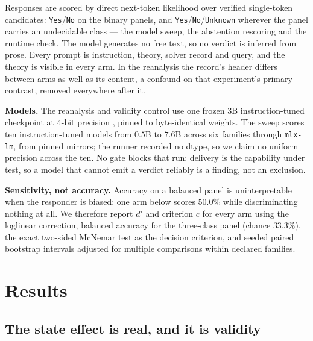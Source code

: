 \documentclass{article}
\begin{document}
Responses are scored by direct next-token likelihood over verified single-token
candidates: \texttt{Yes}/\texttt{No} on the binary panels, and
\texttt{Yes}/\texttt{No}/\texttt{Unknown} wherever the panel carries an
undecidable class --- the model sweep, the abstention rescoring and the runtime
check. The model generates no
free text, so no verdict is inferred from prose. Every prompt is instruction,
theory, solver record and query, and the theory is visible in every arm. In the
reanalysis the record's header differs between arms as well as its content, a
confound on that experiment's primary contrast, removed everywhere after it.

\textbf{Models.} The reanalysis and validity control use one frozen 3B
instruction-tuned checkpoint at 4-bit precision \citep{team2024qwen}, pinned to
byte-identical weights. The sweep scores ten instruction-tuned models from
$0.5$B to $7.6$B across six families
\citep{team2024qwen,grattafiori2024llama,team2025gemma,microsoft2025phi,team2024olmo,allal2025smollm}
through \texttt{mlx-lm}, from pinned mirrors; the runner recorded no dtype,
so we claim no uniform precision across the ten. No gate blocks that run:
delivery is the capability under test, so a model that cannot emit a verdict
reliably is a finding, not an exclusion.

\textbf{Sensitivity, not accuracy.} Accuracy on a balanced panel is
uninterpretable when the responder is biased: one arm below scores $50.0\%$
while discriminating nothing at all. We therefore report $d'$ and criterion $c$
for every arm
\citep{macmillan1991detection,stanislaw1999calculation} using the loglinear
correction, balanced accuracy for the three-class panel (chance $33.3\%$), the
exact two-sided McNemar test \citep{mcnemar1947note} as the decision criterion,
and seeded paired bootstrap intervals \citep{efron1987better} adjusted for
multiple comparisons within declared families.

\section{Results}

\subsection{The state effect is real, and it is validity}
\end{document}
